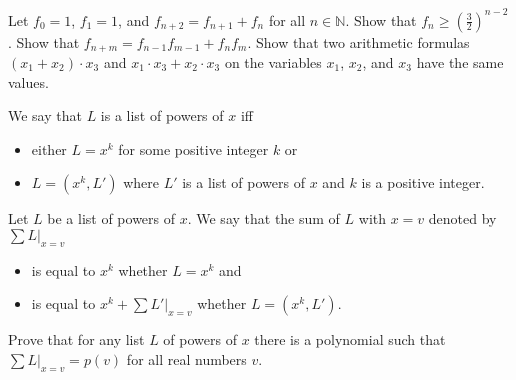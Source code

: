 \begin{exercises}
  \exerciseitem Let $f_0 = 1$, $f_1 = 1$, and $f_{n + 2} = f_{n + 1} + f_n$ for
    all $n \in \mathbb{N}$. Show that
    $f_n \ge \left(\frac{3}{2}\right)^{n - 2}$.
  \exerciseitem Show that $f_{n + m} = f_{n - 1} f_{m - 1} + f_n f_m$.
  \exerciseitem Show that two arithmetic formulas $(x_1 + x_2) \cdot x_3$ and
    $x_1 \cdot x_3 + x_2 \cdot x_3$ on the variables $x_1$, $x_2$, and $x_3$
    have the same values.

  \exerciseitem We say that $L$ is a list of powers of $x$ iff
    \begin{itemize}
      \item either $L = x^k$ for some positive integer $k$ or
      \item $L = (x^k, L')$ where $L'$ is a list of powers of $x$ and
        $k$ is a positive integer.
    \end{itemize}

    Let $L$ be a list of powers of $x$. We say that the sum of $L$
    with $x = v$ denoted by $\sum L\big\rvert_{x = v}$
    \begin{itemize}
      \item is equal to $x^k$ whether $L = x^k$ and
      \item is equal to $x^k + \sum L'\big\rvert_{x = v}$ whether
        $L = (x^k, L')$.
    \end{itemize}

    Prove that for any list $L$ of powers of $x$ there is a polynomial such that
    $\sum L\big\rvert_{x = v} = p(v)$ for all real numbers $v$.

\end{exercises}
